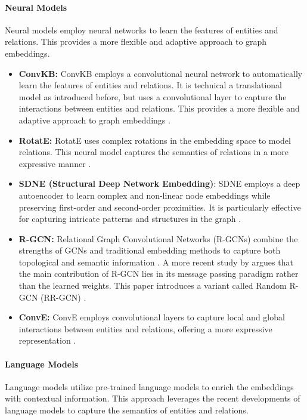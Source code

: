     \paragraph{Neural Models}
    Neural models employ neural networks to learn the features of entities and relations. This provides a more flexible and adaptive approach to graph embeddings.

    \begin{itemize}
        \item \textbf{ConvKB:} ConvKB employs a convolutional neural network to automatically learn the features of entities and relations. It is technical a translational model as introduced before, but uses a convolutional layer to capture the interactions between entities and relations. This provides a more flexible and adaptive approach to graph embeddings \cite{ConvKB18}.
        \item \textbf{RotatE:} RotatE uses complex rotations in the embedding space to model relations. This neural model captures the semantics of relations in a more expressive manner \cite{KG22}.
        \item \textbf{SDNE (Structural Deep Network Embedding)}: SDNE employs a deep autoencoder to learn complex and non-linear node embeddings while preserving first-order and second-order proximities. It is particularly effective for capturing intricate patterns and structures in the graph \cite{SDNE16}.
        \item \textbf{R-GCN:} Relational Graph Convolutional Networks (R-GCNs) combine the strengths of GCNs and traditional embedding methods to capture both topological and semantic information \cite{RGCN18}. A more recent study by \citeauthor{RGCN22} argues that the main contribution of R-GCN lies in its message passing paradigm rather than the learned weights. This paper introduces a variant called Random R-GCN (RR-GCN) \cite{RGCN22}.
        \item \textbf{ConvE:} ConvE employs convolutional layers to capture local and global interactions between entities and relations, offering a more expressive representation \cite{KG22}.
    \end{itemize}

    \paragraph{Language Models}
    Language models utilize pre-trained language models to enrich the embeddings with contextual information. This approach leverages the recent developments of language models to capture the semantics of entities and relations.

